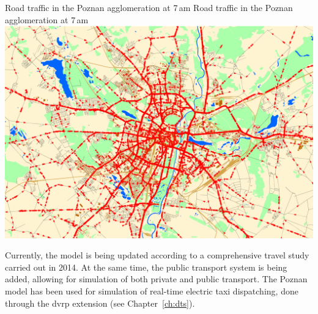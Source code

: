\createfigure%
{Road traffic in the Poznan agglomeration at 7\,am}%
{Road traffic in the Poznan agglomeration at 7\,am}%
{\label{fig:poznan_traffic_simulation}}%
{\includegraphics[width=\textwidth, angle=0]{using/figures/poznan_traffic_simulation}}%
{}%

Currently, the model is being updated according to a comprehensive travel study carried out in 2014. At the same time, the public transport system is being added, allowing for simulation of both private and public transport. The Poznan model has been used for simulation of real-time electric taxi dispatching, done through the \gls{dvrp} \gls{extension} (see Chapter~\ref{ch:dts}).

